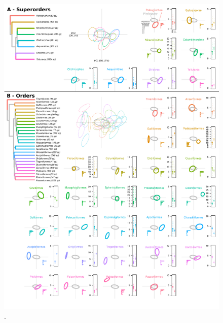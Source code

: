 \documentclass[12pt,letterpaper]{article}
\begin{document}
\begin{figure}[!htbp]
\centering
   \includegraphics[width=1\textwidth]{Figures/ellipses.pdf}
\caption{.}
\label{Fig:ellipses}
\end{figure}
\bigskip
\end{document}
